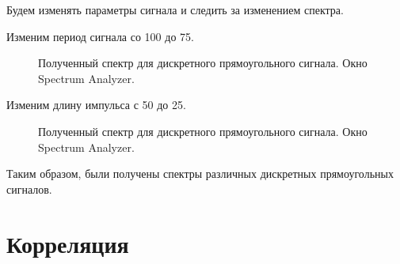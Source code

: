 \documentclass[a4paper,14pt]{extarticle}
\begin{document}
Будем изменять параметры сигнала и следить за изменением спектра.

Изменим период сигнала со 100 до 75.

\begin{figure}[H]
\caption{Полученный спектр для дискретного прямоугольного 
сигнала. Окно Spectrum Analyzer.}
\label{012}
\end{figure}

Изменим длину импульса с 50 до 25.

\begin{figure}[H]
\caption{Полученный спектр для дискретного прямоугольного 
сигнала. Окно Spectrum Analyzer.}
\label{013}
\end{figure}

Таким образом, были получены спектры различных дискретных 
прямоугольных сигналов.

\section{Корреляция}
\end{document}
